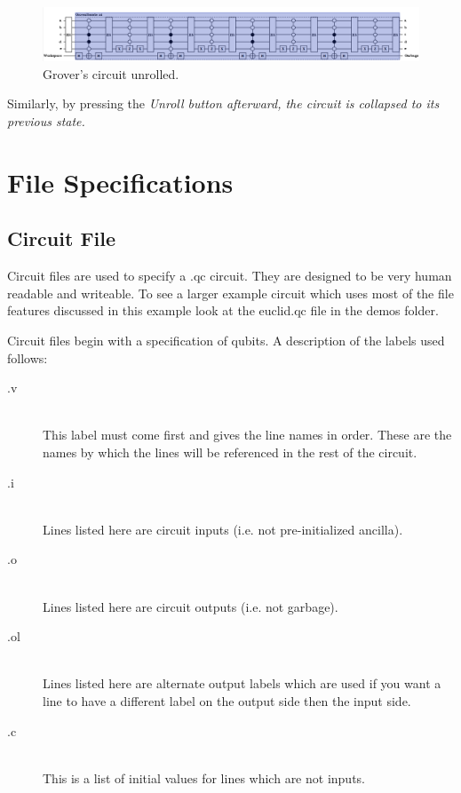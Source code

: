 \documentclass[10pt]{article}
\theoremstyle{definition}
\begin{document}
\begin{figure}
\capstart
\centering
\includegraphics[width=170mm]{Figures/SubCircuits/GroverCircuitUnroll}
\caption{Grover's circuit unrolled.}
\label{f:groverunroll}
\end{figure}

Similarly, by pressing the \em Unroll \em button afterward, the circuit is collapsed to its previous state. 

\section{File Specifications}

\subsection{Circuit File}
Circuit files are used to specify a .qc circuit. They are designed to be very human readable and
writeable.  To see a larger example circuit which uses most of the file features discussed in this example
look at the euclid.qc file in the demos folder.

Circuit files begin with a specification of qubits. A description of the labels used follows:
\begin{description}
\item[.v] \hfill \\
This label must come first and gives the line names in order.  These are the names by which the lines
will be referenced in the rest of the circuit.
\item[.i] \hfill \\
Lines listed here are circuit inputs (i.e. not pre-initialized ancilla).
\item[.o] \hfill \\
Lines listed here are circuit outputs (i.e. not garbage).
\item[.ol] \hfill \\
Lines listed here are alternate output labels which are used if you want a 
line to have a different label on the output side then the input side.
\item[.c] \hfill \\
This is a list of initial values for lines which are not inputs.
\end{description}
\end{document}
